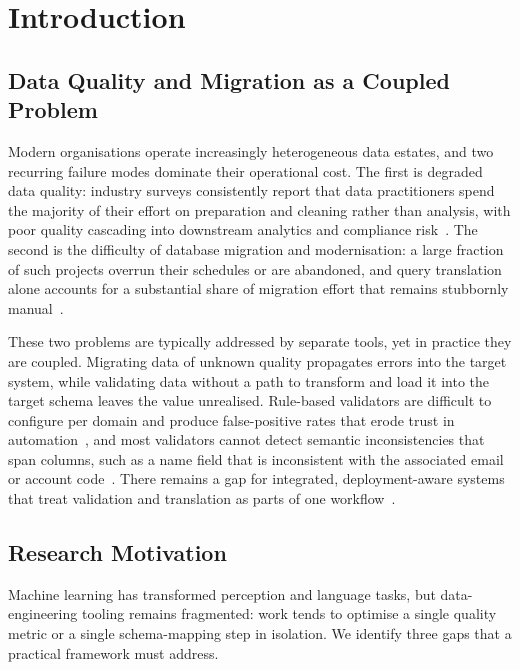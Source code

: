\documentclass{ieeeaccess}
\begin{document}
\section{Introduction}
\label{sec:introduction}

\subsection{Data Quality and Migration as a Coupled Problem}
Modern organisations operate increasingly heterogeneous data estates, and two recurring failure modes dominate their
operational cost. The first is degraded data quality: industry surveys consistently report that data practitioners spend
the majority of their effort on preparation and cleaning rather than analysis, with poor quality cascading into downstream
analytics and compliance risk~\cite{redman1998impact,hultgren2018data}. The second is the difficulty of database
migration and modernisation: a large fraction of such projects overrun their schedules or are abandoned, and query
translation alone accounts for a substantial share of migration effort that remains stubbornly
manual~\cite{stonebraker2007end}.

These two problems are typically addressed by separate tools, yet in practice they are coupled. Migrating data of unknown
quality propagates errors into the target system, while validating data without a path to transform and load it into the
target schema leaves the value unrealised. Rule-based validators are difficult to configure per domain and produce
false-positive rates that erode trust in automation~\cite{batini2009data}, and most validators cannot detect semantic
inconsistencies that span columns, such as a name field that is inconsistent with the associated email or account
code~\cite{ilyas2015functional,motro1989integrity}. There remains a gap for integrated, deployment-aware systems that
treat validation and translation as parts of one workflow~\cite{stonebraker2007end}.

\subsection{Research Motivation}
Machine learning has transformed perception and language tasks, but data-engineering tooling remains fragmented: work
tends to optimise a single quality metric or a single schema-mapping step in isolation. We identify three gaps that a
practical framework must address.
\end{document}
